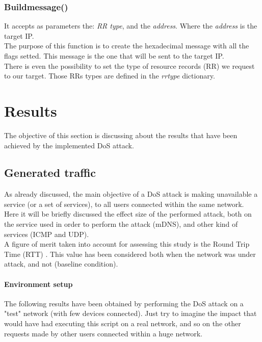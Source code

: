 \documentclass[fleqn, 10pt]{SelfArx} %
\begin{document}
\subsubsection{Build\textunderscore message()}
It accepts as parameters the: {\it{RR type}}, and the {\it{address}}. Where the {\it{address}} is the target IP. \\
The purpose of this function is to create the hexadecimal message with all the flags setted.
This message is the one that will be sent to the target IP. \\ There is even the possibility to set the type of 
resource records (RR) we request to our target. Those RRs types are defined in the {\it{rr\textunderscore type}} dictionary.


\section{Results}
The objective of this section is discussing about the results that have been achieved by the implemented DoS attack.

\subsection{Generated traffic}
As already discussed, the main objective of a DoS attack is making unavailable a service (or a set of services), to all users connected within 
the same network.\\
Here it will be briefly discussed the effect size of the performed attack, both on the service used 
in order to perform the attack (mDNS), and other kind of services (ICMP and UDP).\\
A figure of merit taken into account for assessing this study is the Round Trip Time (RTT) \cite{RTT}. 
This value has been considered both when the network was under attack, and not (baseline condition).

\paragraph{Environment setup}
The following results have been obtained by performing the DoS attack on a "test" network (with few devices connected). 
Just try to imagine the impact that would have had executing this script on a real network, and so on the other requests made by
other users connected within a huge network.
\end{document}
